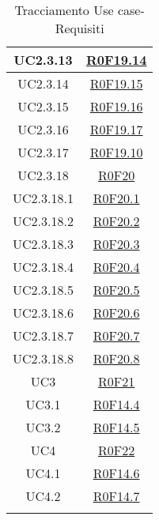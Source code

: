 \documentclass[../AnalisiDeiRequisiti.tex]{subfiles}
\begin{document}
\begin{longtable}{|c|c|}
	UC2.3.13 & \hyperlink{R0F19.14}{R0F19.14}\\\hline
	UC2.3.14 & \hyperlink{R0F19.15}{R0F19.15}\\\hline
	UC2.3.15 & \hyperlink{R0F19.16}{R0F19.16}\\\hline
	UC2.3.16 & \hyperlink{R0F19.17}{R0F19.17}\\\hline
	UC2.3.17 & \hyperlink{R0F19.10}{R0F19.10}\\\hline
	UC2.3.18 & \hyperlink{R0F20}{R0F20}\\\hline
	UC2.3.18.1 & \hyperlink{R0F20.1}{R0F20.1}\\\hline
	UC2.3.18.2 & \hyperlink{R0F20.2}{R0F20.2}\\\hline
	UC2.3.18.3 & \hyperlink{R0F20.3}{R0F20.3}\\\hline
	UC2.3.18.4 & \hyperlink{R0F20.4}{R0F20.4}\\\hline
	UC2.3.18.5 & \hyperlink{R0F20.5}{R0F20.5}\\\hline
	UC2.3.18.6 & \hyperlink{R0F20.6}{R0F20.6}\\\hline
	UC2.3.18.7 & \hyperlink{R0F20.7}{R0F20.7}\\\hline
	UC2.3.18.8 & \hyperlink{R0F20.8}{R0F20.8}\\\hline
	UC3 & \hyperlink{R0F21}{R0F21}\\\hline
	UC3.1 & \hyperlink{R0F14.4}{R0F14.4}\\\hline
	UC3.2 & \hyperlink{R0F14.5}{R0F14.5}\\\hline
	UC4 & \hyperlink{R0F22}{R0F22}\\\hline
	UC4.1 & \hyperlink{R0F14.6}{R0F14.6}\\\hline
	UC4.2 & \hyperlink{R0F14.7}{R0F14.7}\\\hline
	\caption[Tracciamento Use case-Requisiti]{Tracciamento Use case-Requisiti}
	\label{tabella:fonti-requi}
\end{longtable}
\clearpage
\end{document}
